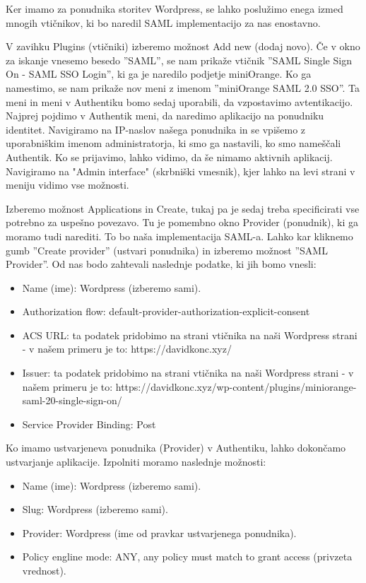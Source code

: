 \documentclass[a4paper,12pt,openright,oneside]{book}
\begin{document}
Ker imamo za ponudnika storitev Wordpress, se lahko poslužimo enega izmed mnogih vtičnikov, ki bo naredil SAML implementacijo za nas enostavno.  

V zavihku Plugins (vtičniki) izberemo možnost Add new (dodaj novo). Če v okno za iskanje vnesemo besedo ''SAML'', se nam prikaže vtičnik  ''SAML Single Sign On - SAML SSO Login'', ki ga je naredilo podjetje miniOrange\cite{miniOrange}. 
\newline
Ko ga namestimo, se nam prikaže nov meni z imenom ''miniOrange SAML 2.0 SSO''. Ta meni in meni v Authentiku bomo sedaj uporabili, da vzpostavimo avtentikacijo. 
\newline
Najprej pojdimo v Authentik meni, da naredimo aplikacijo na ponudniku identitet. Navigiramo na IP-naslov našega ponudnika in se vpišemo z uporabniškim imenom administratorja, ki smo ga nastavili, ko smo nameščali Authentik. Ko se prijavimo, lahko vidimo, da še nimamo aktivnih aplikacij. Navigiramo na "Admin interface" (skrbniški vmesnik), kjer lahko na levi strani v meniju vidimo vse možnosti.

Izberemo možnost Applications in Create, tukaj pa je sedaj treba specificirati vse potrebno za uspešno povezavo. Tu je pomembno okno Provider (ponudnik), ki ga moramo tudi narediti. To bo naša implementacija SAML-a. Lahko kar kliknemo gumb ''Create provider'' (ustvari ponudnika) in izberemo možnost ''SAML Provider''. 
Od nas bodo zahtevali naslednje podatke, ki jih bomo vnesli:
\begin{itemize}
    \item Name (ime): Wordpress (izberemo sami).
    \item Authorization flow: default-provider-authorization-explicit-consent
    \item ACS URL: ta podatek pridobimo na strani vtičnika na naši Wordpress strani - v našem primeru je to: https://davidkonc.xyz/
    \item Issuer: ta podatek pridobimo na strani vtičnika na naši Wordpress strani - v našem primeru je to: https://davidkonc.xyz/wp-content/plugins/miniorange-saml-20-single-sign-on/
    \item Service Provider Binding:  Post
\end{itemize}

Ko imamo ustvarjeneva ponudnika (Provider) v Authentiku, lahko dokončamo ustvarjanje aplikacije. Izpolniti moramo naslednje možnosti:
\begin{itemize}
    \item Name (ime): Wordpress (izberemo sami).
    \item Slug: Wordpress (izberemo sami).
    \item Provider: Wordpress (ime od pravkar ustvarjenega ponudnika).
    \item Policy engline mode: ANY, any policy must match to grant access (privzeta vrednost). 
\end{itemize}
\end{document}
